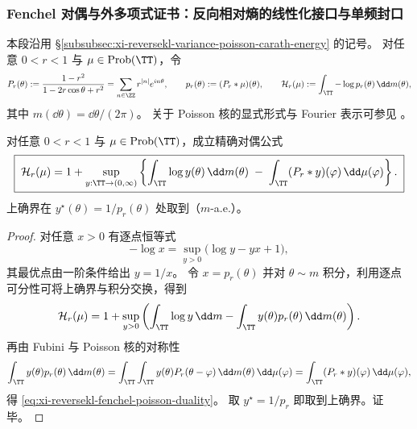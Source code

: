 \subsubsection{Fenchel 对偶与外多项式证书：反向相对熵的线性化接口与单频封口}\label{subsubsec:xi-reversekl-fenchel-poisson-duality-polynomial-witness}
本段沿用 \S\ref{subsubsec:xi-reversekl-variance-poisson-carath-energy} 的记号。
对任意 \(0<r<1\) 与 \(\mu\in\mathrm{Prob}(\TT)\)，令
\[
P_r(\theta):=\frac{1-r^2}{1-2r\cos\theta+r^2}
=\sum_{n\in\ZZ}r^{|n|}e^{in\theta},
\qquad
p_r(\theta):=(P_r*\mu)(\theta),
\qquad
\mathcal H_r(\mu):=\int_{\TT}-\log p_r(\theta)\,\dd m(\theta),
\]
其中 \(m(\dd\theta)=\dd\theta/(2\pi)\)。
关于 Poisson 核的显式形式与 Fourier 表示可参见 \cite{Duren1970TheoryHp,Garnett2007BoundedAnalyticFunctions}。

\begin{theorem}\label{thm:xi-reversekl-fenchel-poisson-duality}
对任意 \(0<r<1\) 与 \(\mu\in\mathrm{Prob}(\TT)\)，成立精确对偶公式
\begin{equation}\label{eq:xi-reversekl-fenchel-poisson-duality}
\boxed{\;
\mathcal H_r(\mu)
=1+\sup_{y:\TT\to(0,\infty)}
\left\{\int_{\TT}\log y(\theta)\,\dd m(\theta)\;-\;\int_{\TT}(P_r*y)(\varphi)\,\dd\mu(\varphi)\right\}.
\;}
\end{equation}
上确界在 \(y^\star(\theta)=1/p_r(\theta)\) 处取到（\(m\)-a.e.）。
\end{theorem}
\begin{proof}
对任意 \(x>0\) 有逐点恒等式
\[
-\log x=\sup_{y>0}\bigl(\log y-yx+1\bigr),
\]
其最优点由一阶条件给出 \(y=1/x\)。
令 \(x=p_r(\theta)\) 并对 \(\theta\sim m\) 积分，利用逐点可分性可将上确界与积分交换，得到
\[
\mathcal H_r(\mu)
=1+\sup_{y>0}\left(\int_{\TT}\log y\,\dd m-\int_{\TT}y(\theta)p_r(\theta)\,\dd m(\theta)\right).
\]
再由 Fubini 与 Poisson 核的对称性
\[
\int_{\TT}y(\theta)p_r(\theta)\,\dd m(\theta)
=\int_{\TT}\int_{\TT}y(\theta)P_r(\theta-\varphi)\,\dd m(\theta)\,\dd\mu(\varphi)
=\int_{\TT}(P_r*y)(\varphi)\,\dd\mu(\varphi),
\]
得 \eqref{eq:xi-reversekl-fenchel-poisson-duality}。
取 \(y^\star=1/p_r\) 即取到上确界。证毕。
\end{proof}

